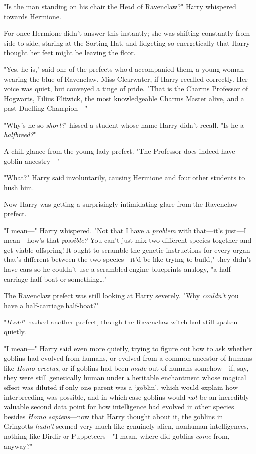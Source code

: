 "Is the man standing on his chair the Head of Ravenclaw?" Harry whispered 
towards Hermione.

For once Hermione didn't answer this instantly; she was shifting constantly 
from side to side, staring at the Sorting Hat, and fidgeting so energetically 
that Harry thought her feet might be leaving the floor.

"Yes, he is," said one of the prefects who'd accompanied them, a young woman 
wearing the blue of Ravenclaw. Miss Clearwater, if Harry recalled correctly. 
Her voice was quiet, but conveyed a tinge of pride. "That is the Charms 
Professor of Hogwarts, Filius Flitwick, the most knowledgeable Charms Master 
alive, and a past Duelling Champion---"

"Why's he so \emph{short?}" hissed a student whose name Harry didn't recall. 
"Is he a \emph{halfbreed?}"

A chill glance from the young lady prefect. "The Professor does indeed have 
goblin ancestry---"

"What?" Harry said involuntarily, causing Hermione and four other students to 
hush him.

Now Harry was getting a surprisingly intimidating glare from the Ravenclaw 
prefect.

"I mean---" Harry whispered. "Not that I have a \emph{problem} with that---it's 
just---I mean---how's that \emph{possible?} You can't just mix two different 
species together and get viable offspring! It ought to scramble the genetic 
instructions for every organ that's different between the two species---it'd be 
like trying to build," they didn't have cars so he couldn't use a 
scrambled-engine-blueprints analogy, "a half-carriage half-boat or 
something{\ldots}"

The Ravenclaw prefect was still looking at Harry severely. "Why \emph{couldn't} 
you have a half-carriage half-boat?"

"\emph{Hssh!}" hsshed another prefect, though the Ravenclaw witch had still 
spoken quietly.

"I mean---" Harry said even more quietly, trying to figure out how to ask 
whether goblins had evolved from humans, or evolved from a common ancestor of 
humans like \emph{Homo erectus}, or if goblins had been \emph{made} out of 
humans somehow---if, say, they were still genetically human under a heritable 
enchantment whose magical effect was diluted if only one parent was a `goblin', 
which would explain how interbreeding was possible, and in which case goblins 
would \emph{not} be an incredibly valuable second data point for how 
intelligence had evolved in other species besides \emph{Homo sapiens}---now 
that Harry thought about it, the goblins in Gringotts \emph{hadn't} seemed very 
much like genuinely alien, nonhuman intelligences, nothing like Dirdir or 
Puppeteers---"I mean, where did goblins \emph{come} from, anyway?"


